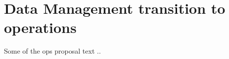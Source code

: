 


\section{ Data Management transition to operations} \label{sec:org}
Some of the ops proposal text ..
